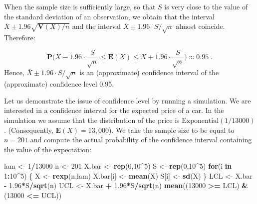 \documentclass[]{krantz}
\makeatletter
\newenvironment{Shaded}{\begin{snugshade}}{\end{snugshade}}
\newcommand{\ControlFlowTok}[1]{\textcolor[rgb]{0.13,0.29,0.53}{\textbf{#1}}}
\newcommand{\DecValTok}[1]{\textcolor[rgb]{0.00,0.00,0.81}{#1}}
\newcommand{\FloatTok}[1]{\textcolor[rgb]{0.00,0.00,0.81}{#1}}
\newcommand{\KeywordTok}[1]{\textcolor[rgb]{0.13,0.29,0.53}{\textbf{#1}}}
\newcommand{\NormalTok}[1]{#1}
\newcommand{\OperatorTok}[1]{\textcolor[rgb]{0.81,0.36,0.00}{\textbf{#1}}}
\newcommand{\StringTok}[1]{\textcolor[rgb]{0.31,0.60,0.02}{#1}}
\newcommand{\Expec}{\mathbf{E}}
\newcommand{\Prob}{\mathbf{P}}
\newcommand{\Var}{\mathbf{V}}
\newenvironment{kframe}{%
\medskip{}
\setlength{\fboxsep}{.8em}
 \def\at@end@of@kframe{}%
 \ifinner\ifhmode%
  \def\at@end@of@kframe{\end{minipage}}%
  \begin{minipage}{\columnwidth}%
 \fi\fi%
 \def\FrameCommand##1{\hskip\@totalleftmargin \hskip-\fboxsep
 \colorbox{shadecolor}{##1}\hskip-\fboxsep
     \hskip-\linewidth \hskip-\@totalleftmargin \hskip\columnwidth}%
 \MakeFramed {\advance\hsize-\width
   \@totalleftmargin\z@ \linewidth\hsize
   \@setminipage}}%
 {\par\unskip\endMakeFramed%
 \at@end@of@kframe}
\renewenvironment{Shaded}{\begin{kframe}}{\end{kframe}}
\theoremstyle{definition}
\theoremstyle{definition}
\theoremstyle{definition}
\theoremstyle{remark}
\makeatother
\begin{document}
When the sample size is sufficiently large, so that \(S\) is very close to
the value of the standard deviation of an observation, we obtain that
the interval \(\bar X \pm 1.96 \sqrt{\Var(X)/n}\) and the interval
\(\bar X \pm 1.96 \cdot S/\sqrt{n}\) almost coincide. Therefore:

\[\Prob \bigg( \bar X -1.96 \cdot \frac{S}{\sqrt{n}} \leq  \Expec(X) \leq \bar X + 1.96 \cdot \frac{S}{\sqrt{n}}\bigg) \approx 0.95\;.\]
Hence, \(\bar X \pm 1.96 \cdot S/\sqrt{n}\) is an (approximate) confidence
interval of the (approximate) confidence level 0.95.

Let us demonstrate the issue of confidence level by running a
simulation. We are interested in a confidence interval for the expected
price of a car. In the simulation we assume that the distribution of the
price is \(\mathrm{Exponential}(1/13000)\). (Consequently,
\(\Expec(X) = 13,000\)). We take the sample size to be equal to \(n=201\)
and compute the actual probability of the confidence interval containing
the value of the expectation:

\begin{Shaded}
\begin{Highlighting}[]
\NormalTok{lam <-}\StringTok{ }\DecValTok{1}\OperatorTok{/}\DecValTok{13000}
\NormalTok{n <-}\StringTok{ }\DecValTok{201}
\NormalTok{X.bar <-}\StringTok{ }\KeywordTok{rep}\NormalTok{(}\DecValTok{0}\NormalTok{,}\DecValTok{10}\OperatorTok{^}\DecValTok{5}\NormalTok{)}
\NormalTok{S <-}\StringTok{ }\KeywordTok{rep}\NormalTok{(}\DecValTok{0}\NormalTok{,}\DecValTok{10}\OperatorTok{^}\DecValTok{5}\NormalTok{)}
\ControlFlowTok{for}\NormalTok{(i }\ControlFlowTok{in} \DecValTok{1}\OperatorTok{:}\DecValTok{10}\OperatorTok{^}\DecValTok{5}\NormalTok{) \{}
\NormalTok{  X <-}\StringTok{ }\KeywordTok{rexp}\NormalTok{(n,lam)}
\NormalTok{  X.bar[i] <-}\StringTok{ }\KeywordTok{mean}\NormalTok{(X)}
\NormalTok{  S[i] <-}\StringTok{ }\KeywordTok{sd}\NormalTok{(X)}
\NormalTok{\}}
\NormalTok{LCL <-}\StringTok{ }\NormalTok{X.bar }\OperatorTok{-}\StringTok{ }\FloatTok{1.96}\OperatorTok{*}\NormalTok{S}\OperatorTok{/}\KeywordTok{sqrt}\NormalTok{(n)}
\NormalTok{UCL <-}\StringTok{ }\NormalTok{X.bar }\OperatorTok{+}\StringTok{ }\FloatTok{1.96}\OperatorTok{*}\NormalTok{S}\OperatorTok{/}\KeywordTok{sqrt}\NormalTok{(n)}
\KeywordTok{mean}\NormalTok{((}\DecValTok{13000} \OperatorTok{>=}\StringTok{ }\NormalTok{LCL) }\OperatorTok{&}\StringTok{ }\NormalTok{(}\DecValTok{13000} \OperatorTok{<=}\StringTok{ }\NormalTok{UCL))}
\end{Highlighting}
\end{Shaded}
\end{document}
